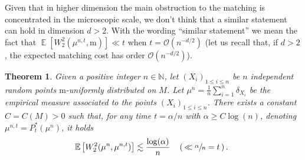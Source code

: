 \documentclass[JEP,XML,SOM,Unicode]{cedram}
\newcounter{results}[section]
\theoremstyle{plain}
\newtheorem{theorem}[results]{Theorem}
\theoremstyle{definition}
\numberwithin{equation}{section}
\newcommand{\NN}{\ensuremath{\mathbb N}}
\newcommand{\E}[1]{\ensuremath{\operatorname{\mathbb{E}}\left[#1\right]}}
\newcommand{\bigo}{\ensuremath{\mathcal{O}}}
\newcommand{\fullstop}{\ensuremath{\text{. }}}
\newcommand{\m}{\ensuremath{\mathrm m}}
\begin{document}
Given that in higher dimension the main obstruction to the matching is concentrated in the
microscopic scale, we don't think that a similar statement can hold in dimension $d>2$.
With the wording ``similar statement'' we mean the fact that $\E{W_2^2(\mu^{n,t}, \m)}\ll t$ when
$t=\bigo(n^{-d/2})$ (let us recall that, if $d>2$, the expected matching
cost has order $\bigo(n^{-d/2})$).
\begin{theorem}\label{thm:near_stability_heat_kernel}
Given a positive integer $n\in\NN$, let $(X_i)_{1\le i\le n}$ be $n$ independent random points
$\m$-uniformly distributed on $M$.
Let $\mu^n = \frac1n\sum_{i=1}^n\delta_{X_i}$ be the empirical measure associated to the
points $(X_i)_{1\le i\le n}$. There exists a constant $C=C(M)>0$ such that, for any
time $t=\alpha/n$ with $\alpha\ge C\log(n)$,
denoting $\mu^{n,t}=P_t^*(\mu^n)$, it holds
\begin{equation*}
\E{W_2^2(\mu^n, \mu^{n,t})} \lesssim
\frac{\log(\alpha)}{n} \quad\left(\,\ll \sfrac{\alpha}{n}=t \,\right)\fullstop
\end{equation*}
\end{theorem}
\end{document}
